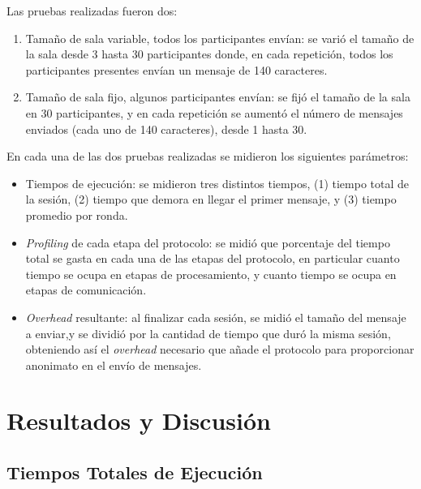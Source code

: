 Las pruebas realizadas fueron dos:

\begin{enumerate}
	\item Tamaño de sala variable, todos los participantes envían: se 
	varió el tamaño de la sala desde 3 hasta 30 participantes donde, en 
	cada repetición, todos los participantes presentes envían un 
	mensaje de 140 caracteres.
	\item Tamaño de sala fijo, algunos participantes envían: se fijó 
	el tamaño de la sala en 30 participantes, y en cada repetición se 
	aumentó el número de mensajes enviados (cada uno de 140 caracteres), 
	desde 1 hasta 30.
\end{enumerate}

En cada una de las dos pruebas realizadas se midieron los siguientes 
parámetros:

\begin{itemize}
	\item Tiempos de ejecución: se midieron tres distintos tiempos, (1) tiempo 
	total de la sesión, (2) tiempo que demora en llegar el primer mensaje, y 
	(3) tiempo promedio por ronda.
	\item \emph{Profiling} de cada etapa del protocolo: se midió que 
	porcentaje del tiempo total se gasta en cada una de las etapas del 
	protocolo, en particular cuanto tiempo se ocupa en etapas de 
	procesamiento, y cuanto tiempo se ocupa en etapas de comunicación.
	\item \emph{Overhead} resultante: al finalizar cada sesión, se midió el 
	tamaño del mensaje a enviar,y se dividió por la cantidad de tiempo que 
	duró la misma sesión, obteniendo así el \emph{overhead} necesario que añade
	el protocolo para proporcionar anonimato en el envío de mensajes.
\end{itemize}

\section{Resultados y Discusión}

\subsection{Tiempos Totales de Ejecución}

